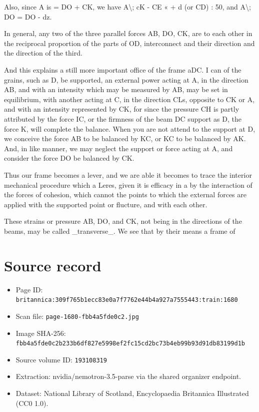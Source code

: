 \documentclass{article}
\begin{document}
Also, since A is = DO + CK, we have A\textbackslash{}; cK - CE « + d (or CD) : 50, and A\textbackslash{}; DO = DO - dz.

In general, any two of the three parallel forces AB, DO, CK, are to each other in the reciprocal proportion of the parts of OD, interconnect and their direction and the direction of the third.

And this explains a still more important office of the frame aDC. I can of the grains, such as D, be supported, an external power acting at A, in the direction AB, and with an intensity which may be measured by AB, may be set in equilibrium, with another acting at C, in the direction CLs, opposite to CK or A, and with an intensity represented by CK, for since the pressure CH is partly attributed by the force IC, or the firmness of the beam DC support as D, the force K, will complete the balance. When you are not attend to the support at D, we conceive the force AB to be balanced by KC, or KC to be balanced by AK. And, in like manner, we may neglect the support or force acting at A, and consider the force DO be balanced by CK.

Thus our frame becomes a lever, and we are able it becomes to trace the interior mechanical procedure which a Leres, given it is efficacy in a by the interaction of the forces of cohesion, which cannot the points to which the external forces are applied with the supported point or flucture, and with each other.

These strains or pressure AB, DO, and CK, not being in the directions of the beams, may be called \_transverse\_. We see that by their means a frame of

\section*{Source record}
\begin{itemize}
\item Page ID: \texttt{britannica:309f765b1ecc83e0a7f7762e44b4a927a7555443:train:1680}
\item Scan file: \texttt{page-1680-fbb4a5fde0c2.jpg}
\item Image SHA-256: \texttt{fbb4a5fde0c2b233b6df827e5998ef2fc15cd2bc73b4eb99b93d91db83199d1b}
\item Source volume ID: \texttt{193108319}
\item Extraction: nvidia/nemotron-3.5-parse via the shared organizer endpoint.
\item Dataset: National Library of Scotland, Encyclopaedia Britannica Illustrated (CC0 1.0).
\end{itemize}
\end{document}

